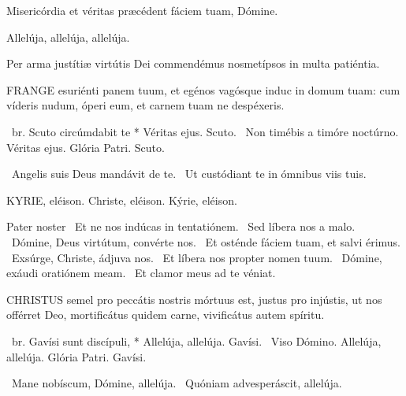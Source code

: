   Misericórdia et véritas præcédent fáciem tuam, Dómine.

  Allelúja, allelúja, allelúja.



 Per arma justítiæ virtútis Dei commendémus nosmetípsos in multa patiéntia.


\lettrine[lines=2]{F}{RANGE} esuriénti panem tuum, et egénos vagósque induc in domum tuam: cum víderis nudum, óperi eum, et carnem tuam ne despéxeris.

\R\ br. Scuto circúmdabit te * Véritas ejus. Scuto. \V\ Non timébis a timóre noctúrno. Véritas ejus. Glória Patri. Scuto.

\V\ Angelis suis Deus mandávit de te. \R\ Ut custódiant te in ómnibus viis tuis.


KYRIE, eléison. Christe, eléison. Kýrie, eléison.

Pater noster  \V\ Et ne nos indúcas in tentatiónem. \R\ Sed líbera nos a malo. \V\ Dómine, Deus virtútum, convérte nos. \R\ Et osténde fáciem tuam, et salvi érimus. \V\ Exsúrge, Christe, ádjuva nos. \R\ Et líbera nos propter nomen tuum. \V\ Dómine, exáudi oratiónem meam. \R\ Et clamor meus ad te véniat.




\lettrine[lines=2]{C}{HRISTUS} semel pro peccátis nostris mórtuus est, justus pro injústis, ut nos offérret Deo, mortificátus quidem carne, vivificátus autem spíritu.

\R\ br. Gavísi sunt discípuli, * Allelúja, allelúja. Gavísi. \V\ Viso Dómino. Allelúja, allelúja. Glória Patri. Gavísi.

\V\ Mane nobíscum, Dómine, allelúja. \R\ Quóniam advesperáscit, allelúja.


\sectionornament


